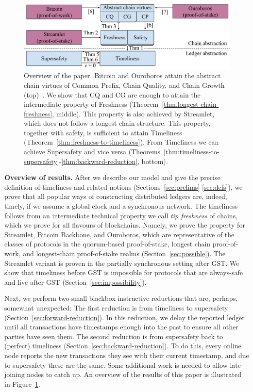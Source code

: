 \begin{figure}
  \centering
  \includegraphics[width=1.0\columnwidth,keepaspectratio]{figures/timeliness-overview.pdf}
  \caption{Overview of the paper. Bitcoin and Ouroboros attain the abstract chain virtues
  of Common Prefix, Chain Quality, and Chain Growth (top)~\cite{backbone,ouroboros}.
  We show that CQ and CG are enough to attain the intermediate property of Freshness
  (Theorem~\ref{thm.longest-chain-freshness}, middle). This property is also achieved by Streamlet, which does
  not follow a longest chain structure. This property, together with safety,
  is sufficient to attain Timeliness
  (Theorem~\ref{thm:freshness-to-timeliness}). From Timeliness we can achieve Supersafety
  and vice versa (Theorems~\ref{thm:timeliness-to-supersafety}-\ref{thm:backward-reduction}, bottom).
  }
 \label{fig:overview}
\end{figure}

\noindent
\textbf{Overview of results.}
After we describe our model and give the precise definition
of timeliness and related notions (Sections~\ref{sec:prelims}-\ref{sec:defs}),
we prove that all popular ways of constructing distributed ledgers
are, indeed, timely, if we assume a global clock and a synchronous network.
The timeliness follows from an intermediate technical property we call \emph{tip freshness}
of chains, which we prove for all flavours of blockchains. Namely, we prove the
property for Streamlet, Bitcoin Backbone, and Ouroboros, which are representative
of the classes of protocols in the quorum-based proof-of-stake, longest chain
proof-of-work, and longest-chain proof-of-stake realms (Section~\ref{sec:possible}).
The Streamlet variant is proven in the partially synchronous setting after GST.
We show that timeliness before GST is impossible for protocols that are always-safe
and live after GST (Section~\ref{sec:impossibility}).

Next, we perform two small blackbox instructive reductions that are, perhaps, somewhat unexpected:
The first reduction is from timeliness to supersafety (Section~\ref{sec:forward-reduction}).
In this reduction, we delay the reported ledger until all
transactions have timestamps enough into the past to ensure all other parties have seen them.
The second reduction is from supersafety back to (perfect) timeliness (Section~\ref{sec:backward-reduction}).
To do this, every online node reports the new transactions they see with
their current timestamp, and due to supersafety these are the same.
Some additional work is needed to allow late-joining nodes to catch up.
An overview of the results of this paper is illustrated in Figure~\ref{fig:overview}.

